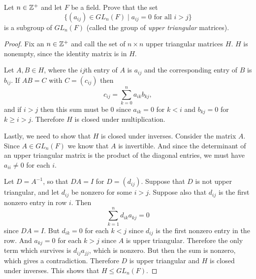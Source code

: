  Let $n\in\mathbb{Z}^+$ and let $F$ be a field. Prove that the
set
\begin{equation*}
  \{(a_{ij})\in GL_n(F)\mid \text{$a_{ij} = 0$ for all $i > j$}\}
\end{equation*}
is a subgroup of $GL_n(F)$ (called the group of {\em upper triangular}
matrices).
\begin{proof}
  Fix an $n\in\mathbb{Z}^+$ and call the set of $n\times n$ upper triangular
  matrices $H$. $H$ is nonempty, since the identity matrix is in $H$.

  Let $A, B\in H$, where the $ij$th entry of $A$ is $a_{ij}$ and the
  corresponding entry of $B$ is $b_{ij}$. If $AB = C$ with
  $C = (c_{ij})$ then
  \begin{equation*}
    c_{ij} = \sum_{k=0}^n a_{ik}b_{kj},
  \end{equation*}
  and if $i > j$ then this sum must be $0$ since $a_{ik} = 0$ for
  $k < i$ and $b_{kj} = 0$ for $k \geq i > j$. Therefore $H$ is closed
  under multiplication.

  Lastly, we need to show that $H$ is closed under inverses. Consider
  the matrix $A$. Since $A\in GL_n(F)$ we know that $A$ is
  invertible. And since the determinant of an upper triangular matrix
  is the product of the diagonal entries, we must have $a_{ii}\neq 0$
  for each $i$.

  Let $D = A^{-1}$, so that $DA = I$ for $D = (d_{ij})$. Suppose that
  $D$ is not upper triangular, and let $d_{ij}$ be nonzero for some
  $i > j$. Suppose also that $d_{ij}$ is the first nonzero entry in
  row $i$. Then
  \begin{equation*}
    \sum_{k=1}^n d_{ik}a_{kj} = 0
  \end{equation*}
  since $DA = I$. But $d_{ik} = 0$ for each $k < j$ since $d_{ij}$ is
  the first nonzero entry in the row. And $a_{kj} = 0$ for each
  $k > j$ since $A$ is upper triangular. Therefore the only term which
  survives is $d_{ij}a_{jj}$, which is nonzero. But then the sum is
  nonzero, which gives a contradiction. Therefore $D$ is upper
  triangular and $H$ is closed under inverses. This shows that
  $H\leq GL_n(F)$.
\end{proof}

